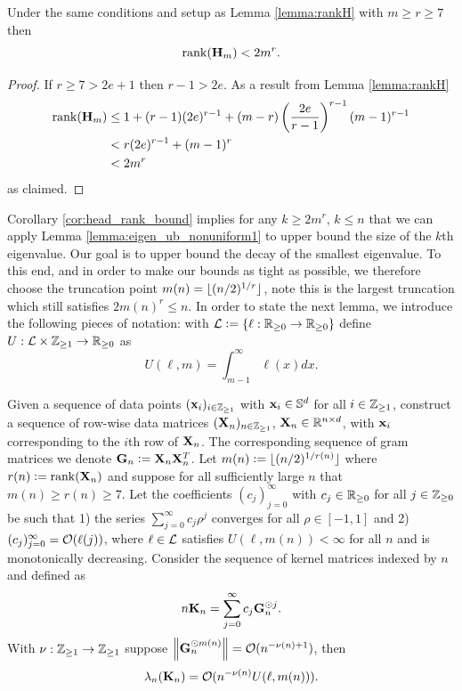 \begin{corollary}\label{cor:head_rank_bound}
    Under the same conditions and setup as Lemma \ref{lemma:rankH} with $m \geq r\geq 7$ then
    \[
    \operatorname{rank}(\mathbf{H}_m) < 2m^{r}.
    \]
\end{corollary}
\begin{proof}
    If $r \geq 7 > 2e+1$ then $r-1 > 2e$. As a result from Lemma \ref{lemma:rankH} 
    \[
    \begin{aligned}
         \operatorname{rank}(\mathbf{H}_m) &\leq 1 + (r-1)(2e)^{r-1} + (m-r)\left(\frac{2e}{r-1}\right)^{r-1} (m-1)^{r-1}\\
         &< r (2e)^{r-1} + (m-1)^r\\
         & < 2m^{r}
    \end{aligned}
    \]
    as claimed.
\end{proof}
Corollary \ref{cor:head_rank_bound} implies for any $k \geq 2m^{r}$, $k \leq n$ that we can apply Lemma \ref{lemma:eigen_ub_nonuniform1} to upper bound the size of the $k$th eigenvalue. Our goal is to upper bound the decay of the smallest eigenvalue. To this end, and in order to make our bounds as tight as possible, we therefore choose the truncation point $m(n)=\lfloor(n/2)^{1/r}\rfloor$, note this is the largest truncation which still satisfies $2m(n)^r \leq n$. In order to state the next lemma, we introduce the following pieces of notation: with $\mathcal{L} \vcentcolon= \{ \ell: \mathbb{R}_{\geq 0} \rightarrow \mathbb{R}_{\geq 0}\}$ define $U:\mathcal{L} \times \mathbb{Z}_{\geq 1} \rightarrow \mathbb{R}_{\geq 0}$ as
\[
    U(\ell,m) = \int_{m-1}^{\infty} \ell(x) dx.
\]
\begin{lemma} \label{lemma:eigen_ub_nonuniform2}
Given a sequence of data points $(\mathbf x_i)_{i \in \mathbb{Z}_{\geq 1}}$ with $\mathbf x_i \in \mathbb{S}^d$ for all $i \in \mathbb{Z}_{\geq 1}$, construct a sequence of row-wise data matrices $(\mathbf{X}_n )_{n \in \mathbb{Z}_{\geq 1}}$, $\mathbf{X}_n \in \mathbb{R}^{n \times d}$, with $\mathbf x_i$ corresponding to the $i$th row of $\mathbf{X}_n$. The corresponding sequence of gram matrices we denote $\mathbf{G}_n \vcentcolon= \mathbf{X}_n \mathbf{X}_n^T$. Let $m(n) \vcentcolon= \lfloor(n/2)^{1/r(n)}\rfloor$ where $r(n) \vcentcolon= \operatorname{rank}(\mathbf{X}_n)$ and suppose for all sufficiently large $n$ that $m(n) \geq r(n) \geq 7$. Let the coefficients $(c_j)_{j=0}^\infty$ with $c_j \in \mathbb{R}_{\geq 0}$ for all $j \in \mathbb{Z}_{\geq 0}$ be such that 1) the series $\sum_{j=0}^{\infty} c_j \rho^j$ converges for all $\rho \in [-1,1]$ and 2) $(c_j)_{j=0}^{\infty}= \mathcal{O}(\ell(j))$, where $\ell \in \mathcal{L}$ satisfies $U(\ell, m(n))< \infty$ for all $n$ and is monotonically decreasing. Consider the sequence of kernel matrices indexed by $n$ and defined as
    \[
    n\mathbf{K}_n = \sum_{j=0}^{\infty}c_j \mathbf{G}_n^{\odot j}.
    \]
With $\nu: \mathbb{Z}_{\geq 1} \rightarrow  \mathbb{Z}_{\geq 1}$ suppose $\left\lVert\mathbf{G}_n^{\odot m(n)}\right\rVert= \mathcal{O}(n^{-\nu(n)+1})$, then
\begin{equation} \label{eq:asym_eigen_ub}
    \lambda_{n}(\mathbf{K}_{n}) = \mathcal{O}(n^{-\nu(n)}U(\ell,m(n))).
\end{equation}
\end{lemma}

